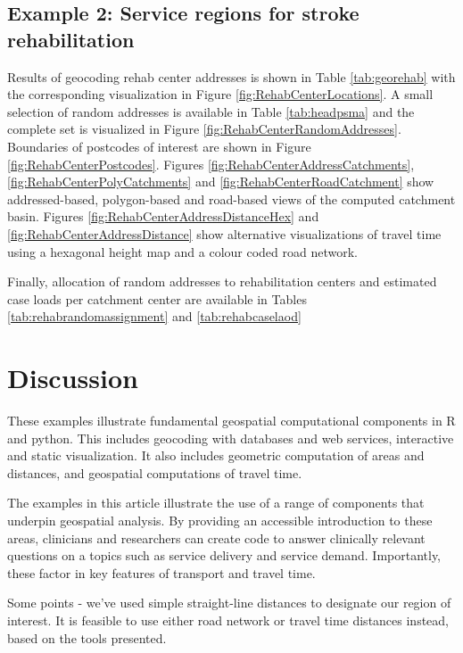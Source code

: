 \documentclass[utf8]{frontiersHLTH}
\begin{document}
\subsection{Example 2: Service regions for stroke rehabilitation}
Results of geocoding rehab center addresses is shown in Table
\ref{tab:georehab} with the corresponding visualization in Figure
\ref{fig:RehabCenterLocations}. A small selection of random addresses
is available in Table \ref{tab:headpsma} and the complete set is
visualized in Figure \ref{fig:RehabCenterRandomAddresses}. Boundaries
of postcodes of interest are shown in Figure
\ref{fig:RehabCenterPostcodes}. Figures
\ref{fig:RehabCenterAddressCatchments},
\ref{fig:RehabCenterPolyCatchments} and \ref{fig:RehabCenterRoadCatchment}
show addressed-based, polygon-based and road-based views of the
computed catchment basin. Figures
\ref{fig:RehabCenterAddressDistanceHex} and
\ref{fig:RehabCenterAddressDistance} show alternative visualizations
of travel time using a hexagonal height map and a colour coded road
network.

Finally, allocation of random addresses to rehabilitation centers and
estimated case loads per catchment center are available in Tables
\ref{tab:rehabrandomassignment} and \ref{tab:rehabcaselaod}

\section{Discussion}\label{discussion}

These examples illustrate fundamental geospatial computational
components in R and python. This includes geocoding with databases and
web services, interactive and static visualization. It also includes
geometric computation of areas and distances, and geospatial
computations of travel time.

The examples in this article illustrate the use of a range of components
that underpin geospatial analysis. By providing an accessible
introduction to these areas, clinicians and researchers can create code
to answer clinically relevant questions on a topics such as service
delivery and service demand. Importantly, these factor in key features
of transport and travel time.

Some points - we've used simple straight-line distances to designate
our region of interest. It is feasible to use either road network or
travel time distances instead, based on the tools presented.



\end{document}
